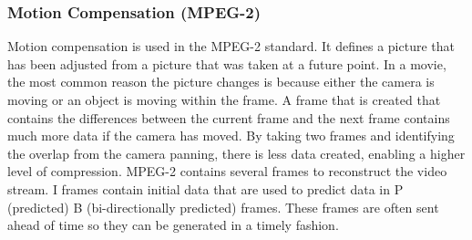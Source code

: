 \documentclass[12pt]{article}
\begin{document}
\subsubsection{Motion Compensation (MPEG-2)}
Motion compensation is used in the MPEG-2 standard. It defines a picture that has been adjusted from a picture that was taken at a future point. In a movie, the most common reason the picture changes is because either the camera is moving or an object is moving within the frame. A frame that is created that contains the differences between the current frame and the next frame contains much more data if the camera has moved. By taking two frames and identifying the overlap from the camera panning, there is less data created, enabling a higher level of compression. MPEG-2 contains several frames to reconstruct the video stream. I frames contain initial data that are used to predict data in P (predicted) B (bi-directionally predicted) frames. These frames are often sent ahead of time so they can be generated in a timely fashion. \citep{Tudor}
\end{document}

